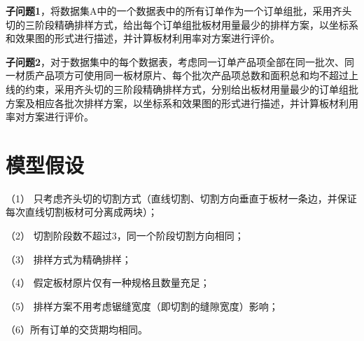 \documentclass[bwprint]{gmcmthesis}
\begin{document}
\textbf{子问题1}，将数据集A中的一个数据表中的所有订单作为一个订单组批，采用齐头切的三阶段精确排样方式，给出每个订单组批板材用量最少的排样方案，以坐标系和效果图的形式进行描述，并计算板材利用率对方案进行评价。

\textbf{子问题2}，对于数据集中的每个数据表，考虑同一订单产品项全部在同一批次、同一材质产品项方可使用同一板材原片、每个批次产品项总数和面积总和均不超过上线的约束，采用齐头切的三阶段精确排样方式，分别给出板材用量最少的订单组批方案及相应各批次排样方案，以坐标系和效果图的形式进行描述，并计算板材利用率对方案进行评价。

\newpage
\section{模型假设}


（1） 只考虑齐头切的切割方式（直线切割、切割方向垂直于板材一条边，并保证每次直线切割板材可分离成两块）；

（2） 切割阶段数不超过3，同一个阶段切割方向相同；

（3） 排样方式为精确排样；

（4） 假定板材原片仅有一种规格且数量充足；

（5） 排样方案不用考虑锯缝宽度（即切割的缝隙宽度）影响；

（6）所有订单的交货期均相同。

\quad
\end{document}
